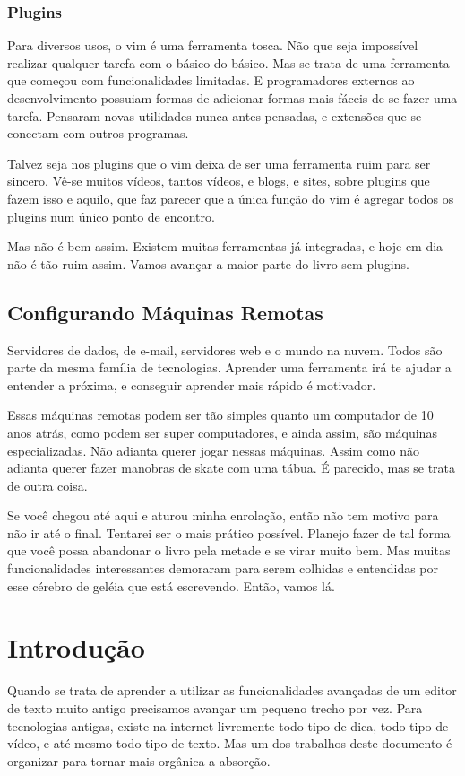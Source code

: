 \documentclass[a4paper, 12pt]{article}
\begin{document}
\subsubsection{Plugins}
Para diversos usos, o vim é uma ferramenta tosca.
Não que seja impossível realizar qualquer tarefa com o básico do básico.
Mas se trata de uma ferramenta que começou com funcionalidades limitadas.
E programadores externos ao desenvolvimento possuiam formas de adicionar formas mais fáceis de se fazer uma tarefa.
Pensaram novas utilidades nunca antes pensadas, e extensões que se conectam com outros programas.

Talvez seja nos plugins que o vim deixa de ser uma ferramenta ruim para ser sincero.
Vê-se muitos vídeos, tantos vídeos, e blogs, e sites, sobre plugins que fazem isso e aquilo, que faz parecer que a única função do vim é agregar todos os plugins num único ponto de encontro.

Mas não é bem assim. Existem muitas ferramentas já integradas, e hoje em dia não é tão ruim assim.
Vamos avançar a maior parte do livro sem plugins.

\subsection{Configurando Máquinas Remotas}
Servidores de dados, de e-mail, servidores web e o mundo na nuvem.
Todos são parte da mesma família de tecnologias.
Aprender uma ferramenta irá te ajudar a entender a próxima, e conseguir aprender mais rápido é motivador.

Essas máquinas remotas podem ser tão simples quanto um computador de 10 anos atrás, como podem ser super computadores, e ainda assim, são máquinas especializadas.
Não adianta querer jogar nessas máquinas.
Assim como não adianta querer fazer manobras de skate com uma tábua.
É parecido, mas se trata de outra coisa.

Se você chegou até aqui e aturou minha enrolação, então não tem motivo para não ir até o final.
Tentarei ser o mais prático possível.
Planejo fazer de tal forma que você possa abandonar o livro pela metade e se virar muito bem.
Mas muitas funcionalidades interessantes demoraram para serem colhidas e entendidas por esse cérebro de geléia que está escrevendo. Então, vamos lá.

\newpage

\section{Introdução}
Quando se trata de aprender a utilizar as funcionalidades avançadas de um editor de texto muito antigo precisamos avançar um pequeno trecho por vez.
Para tecnologias antigas, existe na internet livremente todo tipo de dica, todo tipo de vídeo, e até mesmo todo tipo de texto.
Mas um dos trabalhos deste documento é organizar para tornar mais orgânica a absorção.
\end{document}
